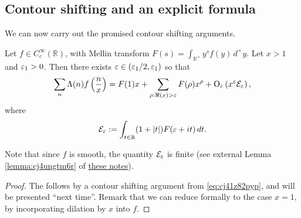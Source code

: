 \documentclass[reqno]{amsart}  \numberwithin{theorem}{section} \numberwithin{equation}{section}
\begin{document}
\subsection{Contour shifting and an explicit formula}
We can now carry out the promised contour shifting arguments.
\begin{proposition}
  Let $f \in C_c^\infty(\mathbb{R})$, with Mellin transform $F(s) = \int_{\mathbb{R}^+} y^s f(y) \,d^\times y$.  Let $x > 1$ and $\varepsilon_1 > 0$.  Then there exists $\varepsilon \in (\varepsilon_1/2,\varepsilon_1)$ so that
  \begin{equation*}
    \sum_n \Lambda (n) f \left( \frac{n}{x} \right)
    = F(1) x + \sum_{\rho : \Re(x) > \varepsilon } F(\rho) x^{\rho}
    +
    \operatorname{O}_{\varepsilon} \left( x^\varepsilon \mathcal{E}_\varepsilon \right),
  \end{equation*}
  where
  \begin{equation*}
\mathcal{E}_{\varepsilon} := \int_{t \in \mathbb{R} }
      (1 + |t|) F(\varepsilon + i t) \, d t.
    \end{equation*}
\end{proposition}
Note that since $f$ is smooth, the quantity $\mathcal{E}_{\varepsilon}$ is finite (see external Lemma \ref{lemma:cj4ungtm6r} of \href{20230907T143130--fourier-and-mellin-transforms.pdf}{these notes}).

\begin{proof}
The follows by a contour shifting argument from \eqref{eq:cj41z82pyp}, and will be presented ``next time''.  Remark that we can reduce formally to the case $x=1$, by incorporating dilation by $x$ into $f$.
\end{proof}


{} 
\end{document}
